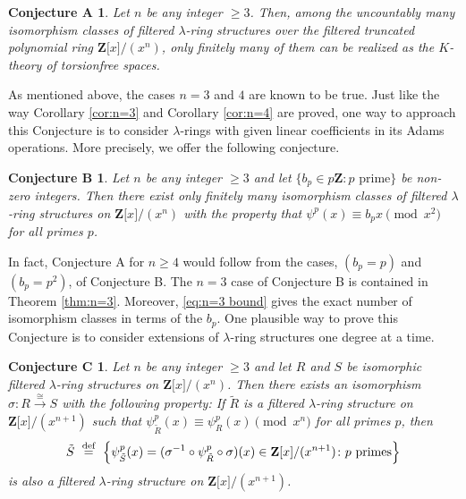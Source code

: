 \documentclass[reqno,11pt]{amsart}
\numberwithin{equation}{subsection}  %
\newtheorem*{conjA}{Conjecture A}
\newtheorem*{conjB}{Conjecture B}
\newtheorem*{conjC}{Conjecture C}
\newcommand{\bZ}{\mathbf{Z}}
\begin{document}
\medskip
\begin{conjA}
\label{conjA}
Let $n$ be any integer $\geq 3$.  Then, among the uncountably many isomorphism classes of filtered $\lambda$-ring structures over the filtered truncated polynomial ring $\bZ \lbrack x \rbrack/(x^n)$, only finitely many of them can be realized as the $K$-theory of torsionfree spaces.
\end{conjA}


As mentioned above, the cases $n = 3$ and $4$ are known to be true.  Just like the way Corollary \ref{cor:n=3} and Corollary \ref{cor:n=4} are proved, one way to approach this Conjecture is to consider $\lambda$-rings with given linear coefficients in its Adams operations.  More precisely, we offer the following conjecture.




\medskip
\begin{conjB}
\label{conjB}
Let $n$ be any integer $\geq 3$ and let $\lbrace b_p \in p \bZ \colon p \text{ prime} \rbrace$ be non-zero integers.  Then there exist only finitely many isomorphism classes of filtered $\lambda$-ring structures on $\bZ \lbrack x \rbrack/(x^n)$ with the property that $\psi^p(x) \equiv b_p x \pmod{x^2}$ for all primes $p$.
\end{conjB}


In fact, Conjecture A for $n \geq 4$ would follow from the cases, $(b_p = p)$ and $(b_p = p^2)$, of Conjecture B.  The $n = 3$ case of Conjecture B is contained in Theorem \ref{thm:n=3}.  Moreover, \eqref{eq:n=3 bound} gives the exact number of isomorphism classes in terms of the $b_p$.  One plausible way to prove this Conjecture is to consider extensions of $\lambda$-ring structures one degree at a time.  





\medskip
\begin{conjC}
\label{conjC}
Let $n$ be any integer $\geq 3$ and let $R$ and $S$ be isomorphic filtered $\lambda$-ring structures on $\bZ \lbrack x \rbrack/(x^n)$.  Then there exists an isomorphism $\sigma \colon R \xrightarrow{\cong} S$ with the following property: If $\tilde{R}$ is a filtered $\lambda$-ring structure on $\bZ \lbrack x \rbrack/(x^{n+1})$ such that $\psi^p_{\tilde{R}}(x) \equiv \psi^p_R(x) \pmod{x^n}$ for all primes $p$, then 
   \begin{equation}
   \label{eq:conjC}
   \tilde{S} ~\buildrel \text{def} \over =~
   \Bigl\lbrace \psi^p_{\tilde{S}}(x) = (\sigma^{-1} \circ \psi^p_{\tilde{R}} \circ \sigma)(x) \in \bZ \lbrack x \rbrack/(x^{n+1}) \colon p \text{ primes} \Bigr\rbrace
   \end{equation}
is also a filtered $\lambda$-ring structure on $\bZ \lbrack x \rbrack/(x^{n+1})$.
\end{conjC}
\end{document}
